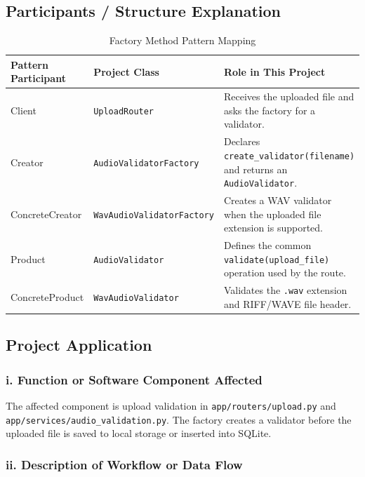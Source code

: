 \subsection{Participants / Structure Explanation}

\begin{table}[H]
  \centering
  \small
  \caption{Factory Method Pattern Mapping}
  \label{tab:factory-method-mapping}
  \begin{tabularx}{\textwidth}{p{} p{} Y}
    \toprule
    \textbf{Pattern Participant} & \textbf{Project Class} & \textbf{Role in This Project} \\
    \midrule
    Client & \texttt{UploadRouter} & Receives the uploaded file and asks the factory for a validator. \\
    Creator & \texttt{AudioValidatorFactory} & Declares \texttt{create\_validator(filename)} and returns an \texttt{AudioValidator}. \\
    ConcreteCreator & \texttt{WavAudioValidatorFactory} & Creates a WAV validator when the uploaded file extension is supported. \\
    Product & \texttt{AudioValidator} & Defines the common \texttt{validate(upload\_file)} operation used by the route. \\
    ConcreteProduct & \texttt{WavAudioValidator} & Validates the \texttt{.wav} extension and RIFF/WAVE file header. \\
    \bottomrule
  \end{tabularx}
\end{table}

\subsection{Project Application}

\subsubsection{i. Function or Software Component Affected}

The affected component is upload validation in \texttt{app/routers/upload.py} and \texttt{app/services/audio\_validation.py}. The factory creates a validator before the uploaded file is saved to local storage or inserted into SQLite.

\subsubsection{ii. Description of Workflow or Data Flow}

